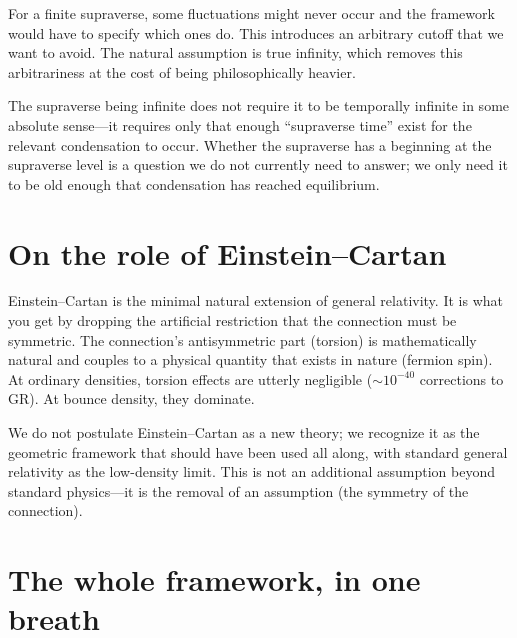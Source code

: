 For a finite supraverse, some fluctuations might never occur and the framework
would have to specify which ones do. This introduces an arbitrary cutoff that we
want to avoid. The natural assumption is true infinity, which removes this
arbitrariness at the cost of being philosophically heavier.

The supraverse being infinite does not require it to be temporally infinite in
some absolute sense---it requires only that enough ``supraverse time'' exist for
the relevant condensation to occur. Whether the supraverse has a beginning at
the supraverse level is a question we do not currently need to answer; we only
need it to be old enough that condensation has reached equilibrium.

\section{On the role of Einstein--Cartan}

Einstein--Cartan is the minimal natural extension of general relativity. It is
what you get by dropping the artificial restriction that the connection must be
symmetric. The connection's antisymmetric part (torsion) is mathematically
natural and couples to a physical quantity that exists in nature (fermion spin).
At ordinary densities, torsion effects are utterly negligible
($\sim 10^{-40}$ corrections to GR). At bounce density, they dominate.

We do not postulate Einstein--Cartan as a new theory; we recognize it as the
geometric framework that should have been used all along, with standard general
relativity as the low-density limit. This is not an additional assumption beyond
standard physics---it is the removal of an assumption (the symmetry of the
connection).

\section{The whole framework, in one breath}
\label{sec:epistemic-copernicus}

